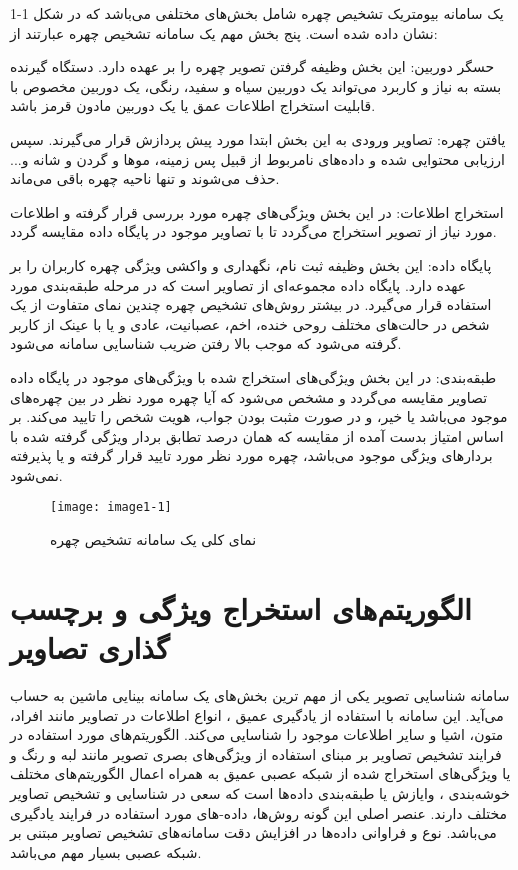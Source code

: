 یک سامانه بیومتریک تشخیص چهره شامل بخش‌های مختلفی می‌باشد که در شکل 1-1 نشان داده شده است. پنج بخش مهم یک سامانه تشخیص چهره عبارتند از:

\noindent
حسگر دوربین: این بخش وظیفه گرفتن تصویر چهره را بر عهده دارد. دستگاه گیرنده بسته به نیاز و کاربرد می‌تواند یک دوربین سیاه و سفید، رنگی، یک دوربین مخصوص با قابلیت استخراج اطلاعات عمق یا یک دوربین مادون قرمز باشد.

\noindent
یافتن چهره: تصاویر ورودی به این بخش ابتدا مورد پیش پردازش قرار می‌گیرند. سپس ارزیابی محتوایی شده و داده‌های نامربوط از قبیل پس زمینه، موها و گردن و شانه و... حذف می‌شوند و تنها ناحیه چهره باقی می‌ماند.

\noindent
استخراج اطلاعات: در این بخش ویژگی‌های چهره مورد بررسی قرار گرفته و اطلاعات مورد نیاز از تصویر استخراج می‌گردد تا با تصاویر موجود در پایگاه داده مقایسه گردد.

\noindent
پایگاه داده: این بخش وظیفه ثبت نام، نگهداری و واکشی ویژگی چهره کاربران را بر عهده دارد. پایگاه داده مجموعه‌ای از تصاویر است که در مرحله طبقه‌بندی مورد استفاده قرار می‌گیرد. در بیشتر روش‌های تشخیص چهره چندین نمای متفاوت از یک شخص در حالت‌های مختلف روحی خنده، اخم، عصبانیت، عادی و یا با عینک از کاربر گرفته می‌شود که موجب بالا رفتن ضریب شناسایی سامانه می‌شود.

\noindent
طبقه‌بندی: در این بخش ویژگی‌های استخراج شده با ویژگی‌های موجود در پایگاه داده تصاویر مقایسه می‌گردد و مشخص می‌شود که آیا چهره مورد نظر در بین چهره‌های موجود می‌باشد یا خیر، و در صورت مثبت بودن جواب، هویت شخص را تایید می‌کند. بر اساس امتیاز بدست آمده از مقایسه که همان درصد تطابق بردار ویژگی گرفته شده با بردارهای ویژگی موجود می‌باشد، چهره مورد نظر مورد تایید قرار گرفته و یا پذیرفته نمی‌شود.

\begin{figure}[!h]
\centering
\texttt{[image: image1-1]}
\caption{ نمای کلی یک سامانه تشخیص چهره \cite{ref20}}
\label{image1-1}
\end{figure}

\section{ الگوریتم‌های استخراج ویژگی و برچسب گذاری تصاویر }
سامانه شناسایی تصویر یکی از مهم ترین بخش‌های یک سامانه بینایی ماشین به حساب می‌آید. این سامانه با استفاده از یادگیری عمیق ، انواع اطلاعات در تصاویر مانند افراد، متون، اشیا و سایر اطلاعات موجود را شناسایی می‌کند. 
الگوریتم‌های مورد استفاده در فرایند تشخیص تصاویر بر مبنای استفاده از ویژگی‌های بصری تصویر مانند لبه و رنگ و یا ویژگی‌های استخراج شده از شبكه‌ عصبی عمیق  به همراه اعمال الگوریتم‌های مختلف خوشه‌بندی ، وایازش  یا طبقه‌بندی  داده‌ها است که سعی در شناسایی و تشخیص تصاویر مختلف دارند. عنصر اصلی این گونه روش‌ها، داده-های مورد استفاده در فرایند یادگیری می‌باشد. نوع و فراوانی داده‌ها در افزایش دقت سامانه‌های تشخیص تصاویر مبتنی بر شبكه‌ عصبی بسیار مهم می‌باشد.

